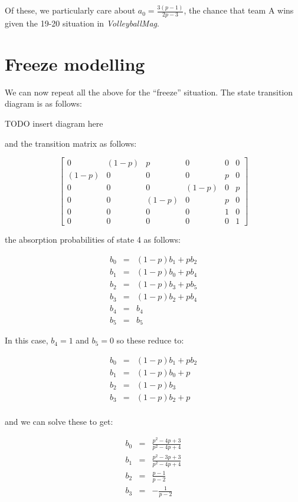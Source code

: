 \documentclass[a4paper,12pt]{article}
\begin{document}
Of these, we particularly care about $a_0 = \frac{3 \left(p - 1\right)}{2 p -
3}$, the chance that team A wins given the 19-20 situation in
\textit{VolleyballMag}.

\section{Freeze modelling}

We can now repeat all the above for the ``freeze'' situation. The state
transition diagram is as follows:

TODO insert diagram here

and the transition matrix as follows:

$$
\begin{bmatrix}
  0 & (1-p) & p & 0 & 0 & 0 \\
  (1-p) & 0 & 0 & 0 & p & 0 \\
  0 & 0 & 0 & (1-p) & 0 & p \\
  0 & 0 & (1-p) & 0 & p & 0 \\
  0 & 0 & 0 & 0 & 1 & 0 \\
  0 & 0 & 0 & 0 & 0 & 1
\end{bmatrix}
$$

the absorption probabilities of state 4 as follows:

\begin{eqnarray*}
  b_0 & = & (1-p)b_1 + pb_2 \\
  b_1 & = & (1-p)b_0 + pb_4 \\
  b_2 & = & (1-p)b_3 + pb_5 \\
  b_3 & = & (1-p)b_2 + pb_4 \\
  b_4 & = & b_4 \\
  b_5 & = & b_5
\end{eqnarray*}

In this case, $b_4 = 1$ and $b_5 = 0$ so these reduce to:

\begin{eqnarray*}
  b_0 & = & (1-p)b_1 + pb_2 \\
  b_1 & = & (1-p)b_0 + p \\
  b_2 & = & (1-p)b_3 \\
  b_3 & = & (1-p)b_2 + p \\
\end{eqnarray*}

and we can solve these to get:

\begin{eqnarray*}
  b_0 & = & \frac{p^{2} - 4 p + 3}{p^{2} - 4 p + 4} \\
  b_1 & = & \frac{p^{2} - 3 p + 3}{p^{2} - 4 p + 4} \\
  b_2 & = & \frac{p - 1}{p - 2} \\
  b_3 & = & - \frac{1}{p - 2}
\end{eqnarray*}
\end{document}
